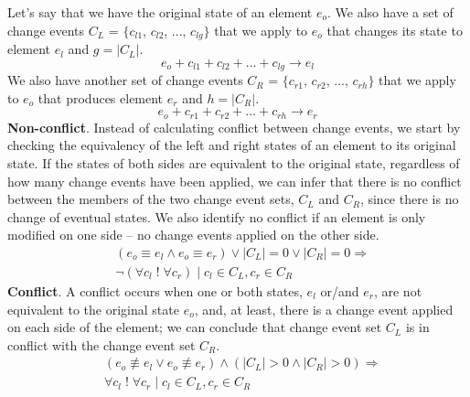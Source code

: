Let's say that we have the original state of an element $e_{o}$. We also have a set of change events $C_{L}$ = $\{$$c_{l1}$, $c_{l2}$, ..., $c_{lg}$$\}$ that we apply to $e_{o}$ that changes its state to element $e_{l}$ and $g = |C_{L}|$. 
\begin{equation} \label{eq:ecbp_left}
e_{o} + c_{l1} + c_{l2} + ... + c_{lg} \rightarrow e_{l}
\end{equation} 
We also have another set of change events $C_{R}$ = $\{$$c_{r1}$, $c_{r2}$, ..., $c_{rh}$$\}$ that we apply to $e_{o}$ that produces element $e_{r}$ and $h = |C_{R}|$.
\begin{equation} \label{eq:ecbp_right}
e_{o} + c_{r1} + c_{r2} + ... + c_{rh} \rightarrow e_{r}
\end{equation} 
\textbf{Non-conflict}. Instead of calculating conflict between change events, we start by checking the equivalency of the left and right states of an element to its original state. If the states of both sides are equivalent to the original state, regardless of how many change events have been applied, we can infer that there is no conflict between the members of the two change event sets, $C_{L}$ and $C_{R}$, since there is no change of eventual states. We also identify no conflict if an element is only modified on one side -- no change events applied on the other side.
\begin{equation} \label{eq:ecbp_nonconflict}
\begin{split}
& (e_{o} \equiv e_{l} \wedge e_{o} \equiv e_{r}) \vee |C_{L}| = 0 \vee |C_{R}| = 0 \Rightarrow\\
& \neg(\forall c_{l} \;!\; \forall c_{r}) \;|\; c_{l} \in C_{L}, c_{r} \in C_{R}
\end{split}
\end{equation} 
\textbf{Conflict}. A conflict occurs when one or both states, $e_{l}$ or/and $e_{r}$, are not equivalent to the original state $e_{o}$, and, at least, there is a change event applied on each side of the element; we can conclude that change event set $C_{L}$ is in conflict with the change event set $C_{R}$.
\begin{equation} \label{eq:ecbp_conflict}
\begin{split}
& (e_{o} \not\equiv e_{l} \vee e_{o} \not\equiv e_{r}) \wedge (|C_{L}| > 0 \wedge |C_{R}| > 0) \Rightarrow\\
& \forall c_{l} \;!\; \forall c_{r} \;|\; c_{l} \in C_{L}, c_{r} \in C_{R}
\end{split}
\end{equation} 
